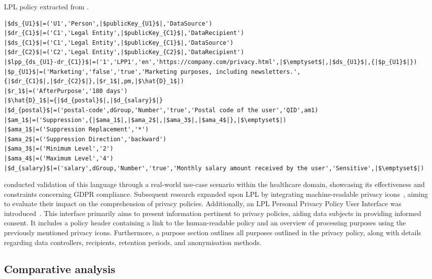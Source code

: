 \begin{listing}[ht]
\caption[LPL policy.]{LPL policy extracted from \cite{gerl_lpl_2018}.}
\label{list:lpl_example}
\begin{verbatim}
|$ds_{U1}$|=('U1','Person',|$publicKey_{U1}$|,'DataSource')
|$dr_{C1}$|=('C1','Legal Entity',|$publicKey_{C1}$|,'DataRecipient')
|$ds_{C1}$|=('C1','Legal Entity',|$publicKey_{C1}$|,'DataSource')
|$dr_{C2}$|=('C2','Legal Entity',|$publicKey_{C2}$|,'DataRecipient')
|$lpp_{ds_{U1}-dr_{C1}}$|=('1','LPP1','en','https://company.com/privacy.html',|$\emptyset$|,|$ds_{U1}$|,{|$p_{U1}$|})
|$p_{U1}$|=('Marketing','false','true','Marketing purposes, including newsletters.',{|$dr_{C1}$|,|$dr_{C2}$|},|$r_1$|,pm,|$\hat{D}_1$|)
|$r_1$|=('AfterPurpose','180 days')
|$\hat{D}_1$|={|$d_{postal}$|,|$d_{salary}$|}
|$d_{postal}$|=('postal-code',dGroup,'Number','true','Postal code of the user','QID',am1)
|$am_1$|=('Suppression',{|$ama_1$|,|$ama_2$|,|$ama_3$|,|$ama_4$|},|$\emptyset$|)
|$ama_1$|=('Suppression Replacement','*')
|$ama_2$|=('Suppression Direction','backward')
|$ama_3$|=('Minimum Level','2')
|$ama_4$|=('Maximum Level','4')
|$d_{salary}$|=('salary',dGroup,'Number','true','Monthly salary amount received by the user','Sensitive',|$\emptyset$|)
\end{verbatim}
\end{listing}

\cite{gerl_privacy_2019} conducted validation of this language through a real-world use-case scenario within the healthcare domain, showcasing its effectiveness and constraints concerning GDPR compliance.
Subsequent research expanded upon LPL by integrating machine-readable privacy icons~\citep{gerl_extending_2018}, aiming to evaluate their impact on the comprehension of privacy policies.
Additionally, an LPL Personal Privacy Policy User Interface was introduced~\citep{gerl_interface_2018}.
This interface primarily aims to present information pertinent to privacy policies, aiding data subjects in providing informed consent.
It includes a policy header containing a link to the human-readable policy and an overview of processing purposes using the previously mentioned privacy icons.
Furthermore, a purpose section outlines all purposes outlined in the privacy policy, along with details regarding data controllers, recipients, retention periods, and anonymisation methods.

\subsection{Comparative analysis}
\label{sec:sota_policies_analysis}

